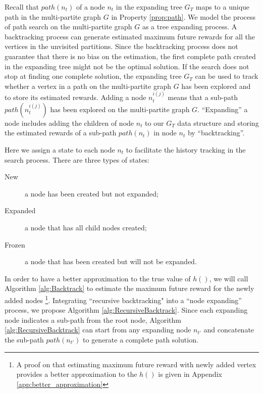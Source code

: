 \documentclass[12pt]{article}
\begin{document}
Recall that $ path(n_{t}) $ of a node $ n_{t} $ in the expanding tree $ G_{T} $ maps to a unique path in the multi-partite graph $ G $ in Property \ref{prop:path}.
We model the process of path search on the multi-partite graph $ G $ as a tree expanding process.
A backtracking process can generate estimated maximum future rewards for all the vertices in the unvisited partitions.
Since the backtracking process does not guarantee that there is no bias on the estimation, the first complete path created in the expanding tree might not be the optimal solution.
If the search does not stop at finding one complete solution, the expanding tree $ G_{T} $ can be used to track whether a vertex in a path on the multi-partite graph $ G $ has been explored and to store its estimated rewards.
Adding a node $ n^{i(j)}_{t} $ means that a sub-path $ path( n^{i(j)}_{t} ) $ has been explored on the multi-partite graph $ G $.
``Expanding'' a node includes adding the children of node $ n_{t} $ to our $ G_{T} $ data structure and storing the estimated rewards of a sub-path $ path(n_{t}) $ in node $ n_{t} $ by ``backtracking''.

Here we assign a state to each node $ n_{t} $ to facilitate the history tracking in the search process. 
There are three types of states:
\begin{description}
\item [New] a node has been created but not expanded;
\item [Expanded] a node that has all child nodes created;
\item [Frozen] a node that has been created but will not be expanded.
\end{description}

In order to have a better approximation to the true value of $ h() $, we will call Algorithm \ref{alg:Backtrack} to estimate the maximum future reward for the newly added nodes
\footnote{A proof on that estimating maximum future reward with newly added vertex provides a better approximation to the $ h() $ is given in Appendix \ref{app:better_approximation} }. 
Integrating ``recursive backtracking" into a ``node expanding'' process, we propose Algorithm \ref{alg:RecursiveBacktrack}.
Since each expanding node indicates a sub-path from the root node, Algorithm \ref{alg:RecursiveBacktrack} can start from any expanding node $ n_{t'} $ and concatenate the sub-path $ path(n_{t'}) $ to generate a complete path solution.
\end{document}
